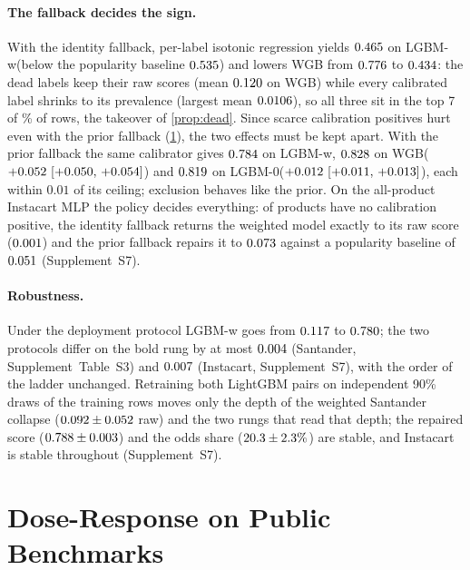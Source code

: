 \documentclass[sigconf,nonacm]{acmart}
\newcommand{\Sm}{\textsf{LGBM-w}\xspace}
\newcommand{\Wm}{\textsf{WGB}\xspace}
\newcommand{\Nm}{\textsf{LGBM-0}\xspace}
\newcommand{\Supp}[1]{Supplement~#1}  %
\begin{document}
\paragraph{The fallback decides the sign.} With the identity fallback, per-label isotonic regression yields $0.465$ on \Sm (below the popularity baseline $0.535$) and lowers \Wm from $0.776$ to $0.434$: the \nSnDead{} dead labels keep their raw scores (mean $0.120$ on \Wm) while every calibrated label shrinks to its prevalence (largest mean $0.0106$), so all three sit in the top 7 of \nWdeadAllRowsPct\% of rows, the takeover of \cref{prop:dead}. Since scarce calibration positives hurt even with the prior fallback (\cref{sec:dose}), the two effects must be kept apart. With the prior fallback the same calibrator gives $0.784$ on \Sm, $0.828$ on \Wm ($+0.052~[+0.050,\,+0.054]$) and $0.819$ on \Nm ($+0.012~[+0.011,\,+0.013]$), each within $0.01$ of its ceiling; exclusion behaves like the prior. On the all-product Instacart MLP the policy decides everything: \nIMASnDead{} of \nIMAnLabels{} products have no calibration positive, the identity fallback returns the weighted model exactly to its raw score ($0.001$) and the prior fallback repairs it to $0.073$ against a popularity baseline of $0.051$ (\Supp{S7}).

\paragraph{Robustness.} Under the deployment protocol \Sm goes from $0.117$ to $0.780$; the two protocols differ on the bold rung by at most $0.004$ (Santander, \Supp{Table~S3}) and $0.007$ (Instacart, \Supp{S7}), with the order of the ladder unchanged. Retraining both LightGBM pairs on \nseedN{} independent 90\% draws of the training rows moves only the depth of the weighted Santander collapse ($0.092 \pm 0.052$ raw) and the two rungs that read that depth; the repaired score ($0.788 \pm 0.003$) and the odds share ($20.3 \pm 2.3\%$) are stable, and Instacart is stable throughout (\Supp{S7}).
\section{Dose-Response on Public Benchmarks}
\label{sec:dose}
\end{document}
